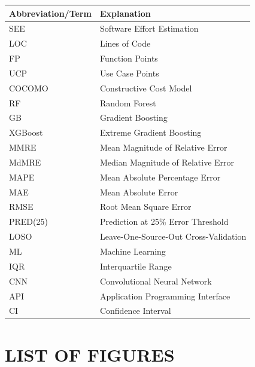 \documentclass[11pt,a4paper]{article}
\begin{document}
\begin{tabular}{|l|l|}
\hline
\textbf{Abbreviation/Term} & \textbf{Explanation} \\
\hline
SEE & Software Effort Estimation \\
LOC & Lines of Code \\
FP & Function Points \\
UCP & Use Case Points \\
COCOMO & Constructive Cost Model \\
RF & Random Forest \\
GB & Gradient Boosting \\
XGBoost & Extreme Gradient Boosting \\
MMRE & Mean Magnitude of Relative Error \\
MdMRE & Median Magnitude of Relative Error \\
MAPE & Mean Absolute Percentage Error \\
MAE & Mean Absolute Error \\
RMSE & Root Mean Square Error \\
PRED(25) & Prediction at 25\% Error Threshold \\
LOSO & Leave-One-Source-Out Cross-Validation \\
ML & Machine Learning \\
IQR & Interquartile Range \\
CNN & Convolutional Neural Network \\
API & Application Programming Interface \\
CI & Confidence Interval \\
\hline
\end{tabular}

\newpage

\section*{LIST OF FIGURES}

\vspace{0.3cm}
\end{document}

